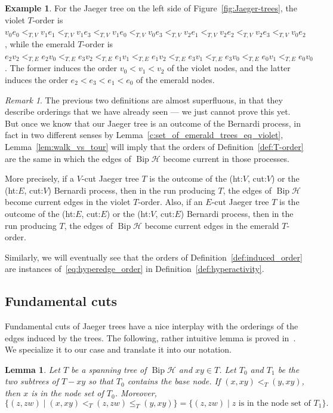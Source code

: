 \documentclass[10pt]{amsart}
\newtheorem{lemma}[theo]{Lemma}
\theoremstyle{definition}\newtheorem{defi}[theo]{Definition}
\newtheorem{exam}[theo]{Example}
\theoremstyle{remark}\newtheorem{rema}[theo]{Remark}
\newcommand{\HH}{\mathcal H}
\DeclareMathOperator{\bip}{Bip}
\begin{document}
\begin{exam}
For the Jaeger tree on the left side of Figure~\ref{fig:Jaeger-trees}, the violet $T$-order is $v_0e_0<_{T,V}v_1e_1<_{T,V}v_1e_3<_{T,V}v_1e_0<_{T,V}v_0e_3<_{T,V}v_2e_1<_{T,V}v_2e_2<_{T,V}v_2e_3<_{T,V}v_0e_2$, while the emerald $T$-order is $e_2v_2<_{T,E}e_2v_0<_{T,E}e_3v_2<_{T,E}e_1v_1<_{T,E}e_1v_2<_{T,E}e_3v_1<_{T,E}e_3v_0<_{T,E}e_0v_1<_{T,E}e_0v_0$. The former induces the order $v_0<v_1<v_2$ of the violet nodes, and the latter induces the order $e_2<e_3<e_1<e_0$ of the emerald nodes.
\end{exam}

\begin{rema}\label{f:orders}
The previous two definitions are almost superfluous, in that they describe orderings that we have already seen --- we just cannot prove this yet. But once we know that our Jaeger tree is an outcome of the Bernardi process, in fact in two different senses by Lemma~\ref{c:set_of_emerald_trees_eq_violet}, Lemma~\ref{lem:walk_vs_tour} will imply that the orders of Definition~\ref{def:T-order} are the same in which the edges of $\bip\HH$ become current in those processes.

More precisely, if a $V$-cut Jaeger tree $T$ is the outcome of the (ht:$V$, cut:$V$) or the (ht:$E$, cut:$V$) Bernardi process, then in the run producing $T$, the edges of $\bip \HH$ become current edges in the violet $T$-order. 
Also, if an $E$-cut Jaeger tree $T$ is the outcome of the (ht:$E$, cut:$E$) or the (ht:$V$, cut:$E$) Bernardi process, then in the run producing $T$, the edges of $\bip \HH$ become current edges in the emerald $T$-order.

Similarly, we will eventually see that the orders of Definition~\ref{def:induced_order} are instances of~\eqref{eq:hyperedge_order} in Definition~\ref{def:hyperactivity}.
\end{rema}


\subsection{Fundamental cuts} 

Fundamental cuts of Jaeger trees have a nice interplay with the orderings of the edges induced by the trees. The following, rather intuitive lemma is proved in~\cite{Bernardi_Tutte}. We specialize it to our case and translate it into our notation.

\begin{lemma}\label{l:parents_in_T-order} \cite[Lemma~5]{Bernardi_Tutte}
	Let $T$ be a spanning tree of $\bip \HH$ and $xy\in T$. Let $T_0$ and $T_1$ be the two subtrees of $T-xy$ so that $T_0$ contains the base node. If $(x,xy) <_T (y,xy)$, then $x$ is in the node set of $T_0$. Moreover, 
\[\{(z,zw)\mid (x,xy) <_T (z,zw) \leq_T (y,xy)\}=\{(z,zw)\mid z\text{ is in the node set of } T_1\}.\]
\end{lemma}
\end{document}
